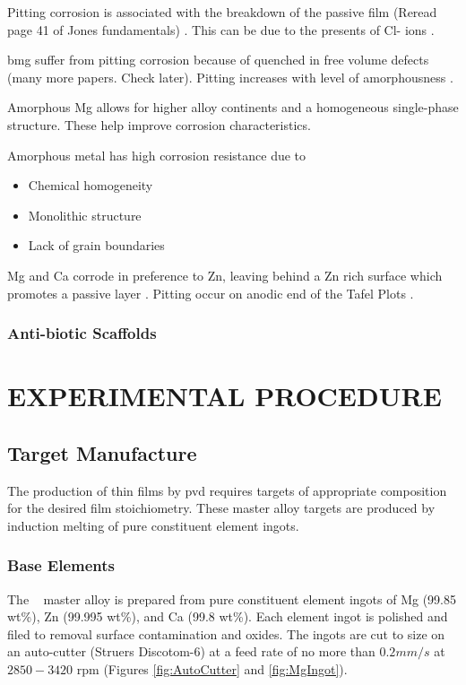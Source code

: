 \documentclass[a4paper,12pt,oneside]{report}%
\begin{document}
Pitting corrosion is associated with the breakdown of the passive film (Reread page 41 of Jones fundamentals) \cite{Zheng2014, Jones1992, Schweitzer2009}. This can be due to the presents of Cl- ions \cite{Zheng2014}. 

 \Gls{bmg} suffer from pitting corrosion because of quenched in free volume defects \cite{Wang2012} (many more papers. Check later). Pitting increases with level of amorphousness \cite{Schluter2012}. 

Amorphous Mg allows for higher alloy continents and a homogeneous single-phase structure. These help improve corrosion characteristics. 

Amorphous metal has high corrosion resistance due to

\begin{itemize}
	\item Chemical homogeneity 
	\item Monolithic structure
	\item Lack of grain boundaries 
\end{itemize}
 
Mg and Ca corrode in preference to Zn, leaving behind a Zn rich surface which promotes a passive layer \cite{Wang2012}.
Pitting occur on anodic end of the Tafel Plots \cite{Schluter2012}.

\subsection{Anti-biotic Scaffolds}



\chapter{EXPERIMENTAL PROCEDURE}
\glsresetall

\section{Target Manufacture}
The production of thin films by \gls{pvd} requires targets of appropriate composition for the desired film stoichiometry. These master alloy targets are produced by induction melting of pure constituent element ingots.

\subsection{Base Elements}
The \MgZnCa~ master alloy is prepared from pure constituent element ingots of Mg (99.85 wt\%), Zn (99.995 wt\%), and Ca (99.8 wt\%). Each element ingot is polished and filed to removal surface contamination and oxides. The ingots are cut to size on an auto-cutter (Struers Discotom-6) at a feed rate of no more than $0.2 mm/s$ at $2850 - 3420$ \acrshort{rpm} (Figures \ref{fig:AutoCutter} and \ref{fig:MgIngot}).
\end{document}
